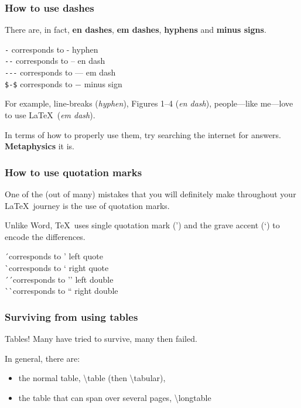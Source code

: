 \documentclass[11pt]{beamer}
\begin{document}
\begin{frame}[containsverbatim]
\frametitle{How to use dashes}

There are, in fact, \textbf{en dashes}, \textbf{em dashes}, \textbf{hyphens} and \textbf{minus signs}.

\bigskip

\centering
\verb|-| corresponds to - hyphen\\
\verb|--| corresponds to -- en dash\\
\verb|---| corresponds to --- em dash\\
\verb|$-$| corresponds to $-$ minus sign

\bigskip

\raggedright
For example, line-breaks (\textit{hyphen}), Figures 1--4 (\textit{en dash}), people---like me---love to use \LaTeX \ (\textit{em dash}). 

In terms of how to properly use them, try searching the internet for answers. \textbf{Metaphysics} it is.

\end{frame}

\begin{frame}
\frametitle{How to use quotation marks}

One of the (out of many) mistakes that you will definitely make throughout your \LaTeX \ journey is the use of quotation marks.

Unlike Word, \TeX \ uses single quotation mark (') and the grave accent (`) to encode the differences.

\bigskip

\centering
\' \ corresponds to ' left quote\\
\` \ corresponds to ` right quote\\
\' \ \' \ corresponds to '' left double\\
\` \ \` \ corresponds to `` right double

\bigskip

\raggedright

\end{frame}

\begin{frame}
	\frametitle{Surviving from using tables}
	
	Tables! Many have tried to survive, many then failed.
	
	\bigskip
	
	In general, there are: 
	
	\begin{itemize}
	\item the normal table, \textbackslash table (then \textbackslash tabular), 
	\item the table that can span over several pages, \textbackslash longtable
	\end{itemize}
\end{frame}
\end{document}
